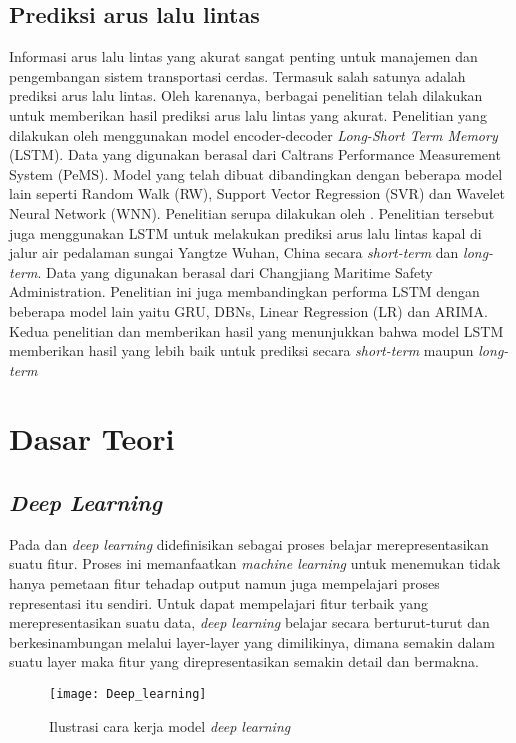 \documentclass[../thesis.tex]{subfiles}
\begin{document}
\subsection{Prediksi arus lalu lintas}
Informasi arus lalu lintas yang akurat sangat penting untuk manajemen dan pengembangan sistem transportasi cerdas. Termasuk salah satunya adalah prediksi arus lalu lintas. Oleh karenanya, berbagai penelitian telah dilakukan untuk memberikan hasil prediksi arus lalu lintas yang akurat.
Penelitian yang dilakukan oleh \cite{LSTM_2} menggunakan model encoder-decoder \textit{Long-Short Term Memory} (LSTM). Data yang digunakan berasal dari Caltrans Performance Measurement System (PeMS). Model yang telah dibuat dibandingkan dengan beberapa model lain seperti Random Walk (RW), Support Vector Regression (SVR) dan Wavelet Neural Network (WNN). 
Penelitian serupa dilakukan oleh \cite{LSTM_1}. Penelitian tersebut juga menggunakan LSTM untuk melakukan prediksi arus lalu lintas kapal di jalur air pedalaman sungai Yangtze Wuhan, China secara \textit{short-term} dan \textit{long-term}. Data yang digunakan berasal dari Changjiang Maritime Safety Administration. Penelitian ini juga membandingkan performa LSTM dengan beberapa model lain yaitu GRU, DBNs, Linear Regression (LR) dan ARIMA.
Kedua penelitian \cite{LSTM_1} dan \cite{LSTM_2} memberikan hasil yang menunjukkan bahwa model LSTM memberikan hasil yang lebih baik untuk prediksi secara \textit{short-term} maupun \textit{long-term}

\section{Dasar Teori}
\subsection{\textit{Deep Learning}}
Pada \cite{DLConcept} dan \cite{DLwithPython} \textit{deep learning} didefinisikan sebagai proses belajar merepresentasikan suatu fitur. Proses ini memanfaatkan \textit{machine learning} untuk menemukan tidak hanya pemetaan fitur tehadap output namun juga mempelajari proses representasi itu sendiri.
Untuk dapat mempelajari fitur terbaik yang merepresentasikan suatu data, \textit{deep learning} belajar secara berturut-turut dan berkesinambungan melalui layer-layer yang dimilikinya, dimana semakin dalam suatu layer maka fitur yang direpresentasikan semakin detail dan bermakna.

\begin{figure}
	\centering
	\texttt{[image: Deep\_learning]}
	\caption{Ilustrasi cara kerja model \textit{deep learning}}
	\label{Dl_model}
\end{figure}
\end{document}
